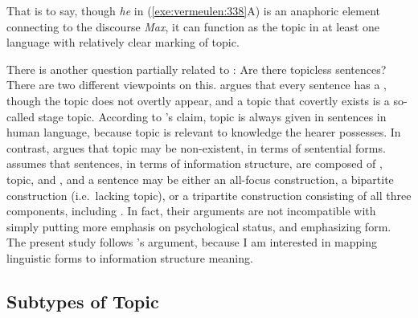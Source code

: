 

\noindent That is to say, though \textit{he}
in (\ref{exe:vermeulen:338}A) is an anaphoric element connecting to the
discourse  \textit{Max}, it can function as the topic in at least
one language with relatively clear marking of topic.  



There is another question partially related to : Are
there topicless sentences?  There are two different viewpoints on
this.  \citet{erteschik:07} argues that every sentence has a ,
though the topic does not overtly appear, and a topic that covertly
exists is a so-called stage topic.  According to
\citeauthor{erteschik:07}'s claim, topic is always given in sentences
in human language, because topic is relevant to knowledge the hearer
possesses. In contrast, \citet{buring:99} argues that topic may be
non-existent, in terms of sentential forms. \citeauthor{buring:99}
assumes that sentences, in terms of information structure, are
composed of , topic, and , and a sentence may be
either an all-focus construction, a bipartite construction
(i.e.\ lacking topic), or a tripartite construction consisting of all
three components, including .  In fact, their
arguments are not incompatible with \citeauthor{erteschik:07} simply
putting more emphasis on psychological status, and
\citeauthor{buring:99} emphasizing form. The present study follows
\citeauthor{buring:99}'s argument, because I am interested in mapping
linguistic forms to information structure meaning.





\subsection{Subtypes of Topic}
\label{3:ssec:subtypes-topic}


